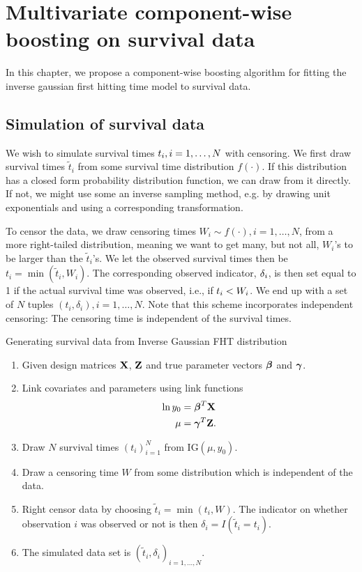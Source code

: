 \chapter{Multivariate component-wise boosting on survival data}
In this chapter, we propose a component-wise boosting algorithm for fitting the inverse gaussian first hitting time model to survival data.

\section{Simulation of survival data}
We wish to simulate survival times $t_{i},i=1,\ldots,N$ with censoring. We first draw survival times $\tilde{t}_i$ from some survival time distribution $f(\cdot)$. If this distribution has a closed form probability distribution function, we can draw from it directly. If not, we might use some an inverse sampling method, e.g. by drawing unit exponentials and using a corresponding transformation.

To censor the data, we draw censoring times $W_i\sim f(\cdot),i=1,\ldots,N$, from a more right-tailed distribution, meaning we want to get many, but not all, $W_i$'s to be larger than the $\tilde{t}_i$'s. We let the observed survival times then be $t_i=\min(\tilde{t}_i,W_i)$.
The corresponding observed indicator, $\delta_{i}$, is then set equal to 1 if the actual survival time was observed, i.e., if $t_{i}<W_i$. We end up with a set of $N$ tuples $(t_i,\delta_i),i=1,\ldots,N$. Note that this scheme incorporates independent censoring: The censoring time is independent of the survival times.

\begin{algorithm}
\caption{Generating survival data from Inverse Gaussian FHT distribution}
\label{algo:FHT-sim}
\begin{enumerate}
    \item Given design matrices $\mathbf{X}$, $\mathbf{Z}$ and true parameter vectors $\boldsymbol{\beta}$ and $\boldsymbol{\gamma}$.
    \item Link covariates and parameters using link functions
        \begin{align*}
            \ln y_0&=\boldsymbol{\beta}^T\mathbf{X} \\
            \mu&=\boldsymbol{\gamma}^T\mathbf{Z}.
        \end{align*}
    \item Draw $N$ survival times $(t_i)_{i=1}^N$ from IG$(\mu,y_0)$.
    \item Draw a censoring time $W$ from some distribution which is independent of the data.
    \item Right censor data by choosing $\widetilde{t}_i=\min(t_i,W)$. The indicator on whether observation $i$ was observed or not is then $\delta_i=I(\widetilde{t}_i=t_i)$.
    \item The simulated data set is $(\widetilde{t}_i,\delta_i)_{i=1,\ldots,N}$.
\end{enumerate}
\end{algorithm}

